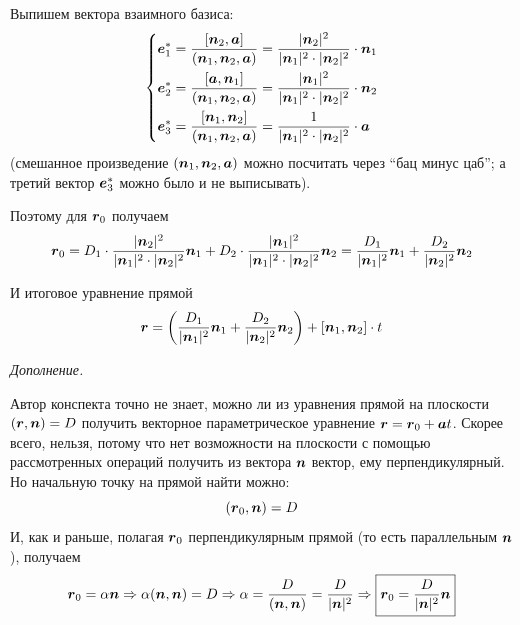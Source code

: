 \documentclass[a4paper,12pt]{article}
\begin{document}
\begin{solution}
\begin{enumerate}
        Выпишем вектора взаимного базиса:
        \[
          \left\{
          \begin{aligned}
            &\boldsymbol e_1^* = \frac{[\boldsymbol n_2, \boldsymbol a]}{(\boldsymbol n_1, \boldsymbol n_2, \boldsymbol a)} = \frac{|\boldsymbol n_2|^2}{|\boldsymbol n_1|^2 \cdot |\boldsymbol n_2|^2} \cdot \boldsymbol n_1\\
            &\boldsymbol e_2^* = \frac{[\boldsymbol a, \boldsymbol n_1]}{(\boldsymbol n_1, \boldsymbol n_2, \boldsymbol a)} = \frac{|\boldsymbol n_1|^2}{|\boldsymbol n_1|^2 \cdot |\boldsymbol n_2|^2} \cdot \boldsymbol n_2\\
            &\boldsymbol e_3^* = \frac{[\boldsymbol n_1, \boldsymbol n_2]}{(\boldsymbol n_1, \boldsymbol n_2, \boldsymbol a)} = \frac{1}{|\boldsymbol n_1|^2 \cdot |\boldsymbol n_2|^2} \cdot \boldsymbol a
          \end{aligned}
          \right.
        \]
        (смешанное произведение $(\boldsymbol n_1, \boldsymbol n_2, \boldsymbol a)$ можно посчитать через ``бац минус цаб''; а третий вектор $\boldsymbol e_3^*$ можно было и не выписывать).
        
        Поэтому для $\boldsymbol r_0$ получаем
        \[
          \boldsymbol r_0
          = D_1 \cdot \frac{|\boldsymbol n_2|^2}{|\boldsymbol n_1|^2 \cdot |\boldsymbol n_2|^2} \boldsymbol n_1 + D_2 \cdot \frac{|\boldsymbol n_1|^2}{|\boldsymbol n_1|^2 \cdot |\boldsymbol n_2|^2} \boldsymbol n_2
          = \frac{D_1}{|\boldsymbol n_1|^2} \boldsymbol n_1 + \frac{D_2}{|\boldsymbol n_2|^2} \boldsymbol n_2
        \]
        
        И итоговое уравнение прямой
        \[
          \boldsymbol r = \left(\frac{D_1}{|\boldsymbol n_1|^2} \boldsymbol n_1 + \frac{D_2}{|\boldsymbol n_2|^2} \boldsymbol n_2\right) + [\boldsymbol n_1, \boldsymbol n_2] \cdot t
        \]
        
        \bigskip
        
        \emph{Дополнение.}
        
        Автор конспекта точно не знает, можно ли из уравнения прямой на плоскости $(\bds r, \bds n) \hm= D$ получить векторное параметрическое уравнение $\bds r \hm= \bds r_0 \hm+ \bds a t$.
        Скорее всего, нельзя, потому что нет возможности на плоскости с помощью рассмотренных операций получить из вектора $\boldsymbol n$ вектор, ему перпендикулярный.
        Но начальную точку на прямой найти можно:
        \[
          (\boldsymbol r_0, \boldsymbol n) = D
        \]
        И, как и раньше, полагая $\boldsymbol r_0$ перпендикулярным прямой (то есть параллельным $\boldsymbol n$), получаем
        \[
          \boldsymbol r_0 = \alpha \boldsymbol n
          \Rightarrow \alpha (\boldsymbol n, \boldsymbol n) = D
          \Rightarrow \alpha = \frac{D}{(\boldsymbol n, \boldsymbol n)} = \frac{D}{|\boldsymbol n|^2} 
          \Rightarrow \boxed{\boldsymbol r_0 = \frac{D}{|\boldsymbol n|^2} \boldsymbol n}
        \]
    \end{enumerate}
  \end{solution}
  
\end{document}
